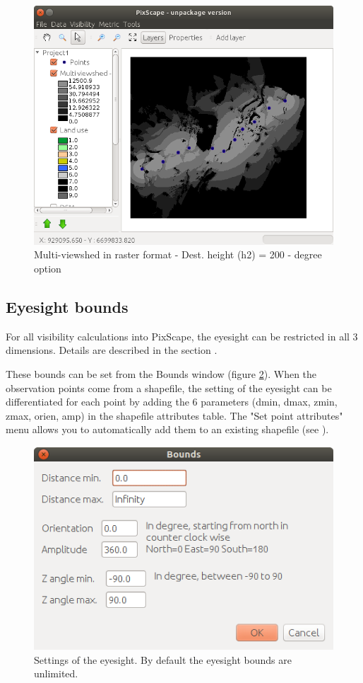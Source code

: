\documentclass{report}
\begin{document}
\begin{figure}[H]
	\includegraphics[scale=0.5]{img/multi_viewshed_raster_deg-en.png} 
	\caption{Multi-viewshed in raster format - Dest. height (h2) = 200 - degree option}
	\label{multi_viewshed_raster_deg}
\end{figure}

\subsection{Eyesight bounds}
\label{bounds_ui}
For all visibility calculations into PixScape, the eyesight can be restricted in all 3 dimensions. Details are described in the section .

These bounds can be set from the Bounds window (figure \ref{bounds_dlg}). When the observation points come from a shapefile, the setting of the eyesight can be differentiated for each point by adding the 6 parameters (dmin, dmax, zmin, zmax, orien, amp) in the shapefile attributes table. The "Set point attributes" menu allows you to automatically add them to an existing shapefile (see ).

\begin{figure}[H]
	\includegraphics[scale=0.5]{img/bounds-en.png} 
	\caption{Settings of the eyesight. By default the eyesight bounds are unlimited.}
	\label{bounds_dlg}
\end{figure}
\end{document}
